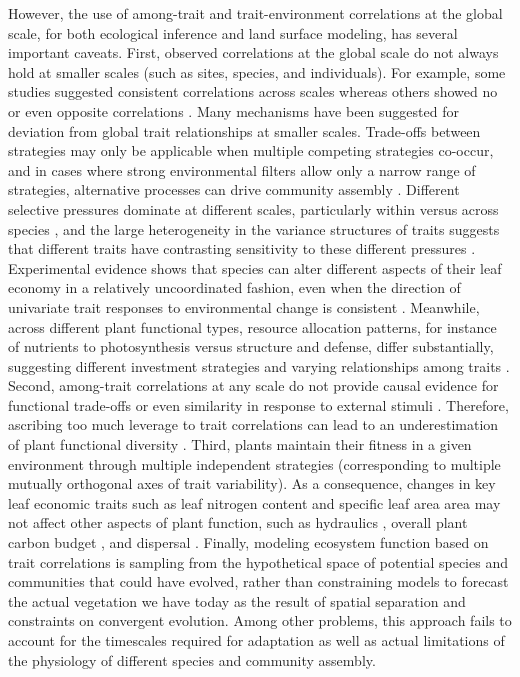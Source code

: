 However, the use of among-trait and trait-environment correlations at the global scale, for both ecological inference and land surface modeling, has several important caveats.
First, observed correlations at the global scale do not always hold at smaller scales (such as sites, species, and individuals).
For example, some studies suggested consistent correlations across scales \cite{wright_worldwide_2004,albert_multi-trait_2010,asner_amazonian_2014}
whereas others showed no or even opposite correlations \cite{albert_intraspecific_2010,messier_how_2010,wright_does_2012,feng_scale_2013,grubb_relationships_2015,wigley_leaf_2016,messier_traitnetwork,kichenin_2013_contrasting}.
Many mechanisms have been suggested for deviation from global trait relationships at smaller scales.
Trade-offs between strategies may only be applicable when multiple competing strategies co-occur, and in cases where strong environmental filters allow only a narrow range of strategies, alternative processes can drive community assembly \cite{rosado_trait_dominance,pierce_csr_cooccur,grim_pierce_book}.
Different selective pressures dominate at different scales, particularly within versus across species \cite{albert_intraspecific_2010,messier_how_2010,kichenin_2013_contrasting},
and the large heterogeneity in the variance structures of traits suggests that different traits have contrasting sensitivity to these different pressures \cite{messier_trait_2016}.
Experimental evidence shows that species can alter different aspects of their leaf economy in a relatively uncoordinated fashion, even when the direction of univariate trait responses to environmental change is consistent \cite{wright_does_2012}.
Meanwhile, across different plant functional types, resource allocation patterns, for instance of nutrients to photosynthesis versus structure and defense, differ substantially, suggesting different investment strategies and varying relationships among traits \cite{ghimire_2017_Nallocation}.
Second, among-trait correlations at any scale do not provide causal evidence for functional trade-offs or even similarity in response to external stimuli \cite{messier_trait_2016}.
Therefore, ascribing too much leverage to trait correlations can lead to an underestimation of plant functional diversity \cite{grubb_trade-offs_2015}.
Third, plants maintain their fitness in a given environment through multiple independent strategies (corresponding to multiple mutually orthogonal axes of trait variability).
As a consequence, changes in key leaf economic traits such as leaf nitrogen content and specific leaf area area may not affect other aspects of plant function, such as
hydraulics \cite{li_leaf_2015},
overall plant carbon budget \cite{edwards_leaf_2014},
and dispersal \cite{westoby_plant_2002}.
Finally, modeling ecosystem function based on trait correlations is sampling from the hypothetical space of potential species and communities that could have evolved, rather than constraining models to forecast the actual vegetation we have today as the result of spatial separation and constraints on convergent evolution.
Among other problems, this approach fails to account for the timescales required for adaptation as well as actual limitations of the physiology of different species and community assembly.


